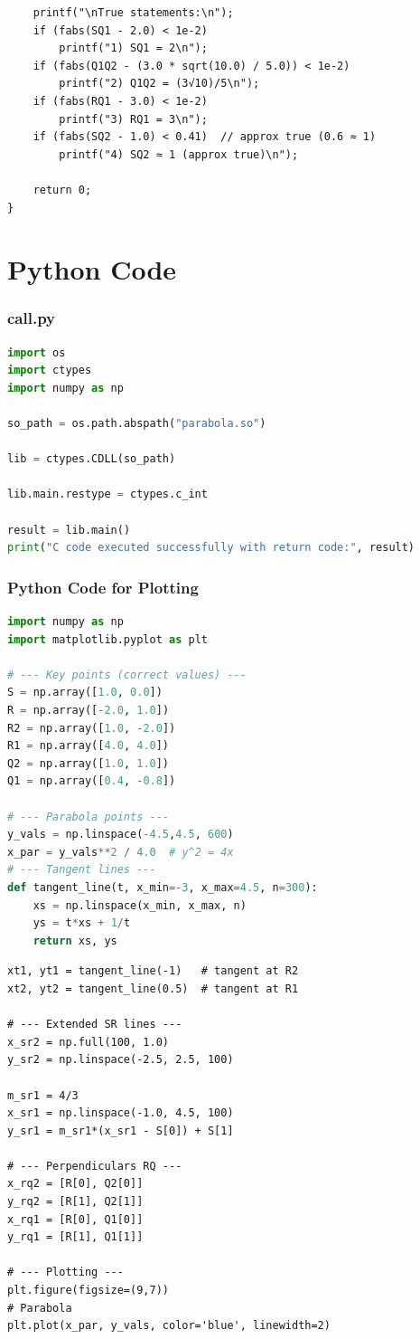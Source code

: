 \documentclass{beamer}
\theoremstyle{remark}
\numberwithin{equation}{section}
\numberwithin{equation}{section}
\begin{document}
\begin{frame}[fragile]
\begin{lstlisting}
    printf("\nTrue statements:\n");
    if (fabs(SQ1 - 2.0) < 1e-2)
        printf("1) SQ1 = 2\n");
    if (fabs(Q1Q2 - (3.0 * sqrt(10.0) / 5.0)) < 1e-2)
        printf("2) Q1Q2 = (3√10)/5\n");
    if (fabs(RQ1 - 3.0) < 1e-2)
        printf("3) RQ1 = 3\n");
    if (fabs(SQ2 - 1.0) < 0.41)  // approx true (0.6 ≈ 1)
        printf("4) SQ2 ≈ 1 (approx true)\n");

    return 0;
}

\end{lstlisting}
\end{frame}

\section{Python Code}
\begin{frame}[fragile]
\frametitle{call.py}
\begin{lstlisting}[language=Python]
import os
import ctypes
import numpy as np  

so_path = os.path.abspath("parabola.so")

lib = ctypes.CDLL(so_path)

lib.main.restype = ctypes.c_int

result = lib.main()
print("C code executed successfully with return code:", result)

\end{lstlisting}
\end{frame}
\begin{frame}[fragile]
\frametitle{Python Code for Plotting}
\begin{lstlisting}[language=Python]
import numpy as np
import matplotlib.pyplot as plt

# --- Key points (correct values) ---
S = np.array([1.0, 0.0])
R = np.array([-2.0, 1.0])
R2 = np.array([1.0, -2.0])
R1 = np.array([4.0, 4.0])
Q2 = np.array([1.0, 1.0])
Q1 = np.array([0.4, -0.8])

# --- Parabola points ---
y_vals = np.linspace(-4.5,4.5, 600)
x_par = y_vals**2 / 4.0  # y^2 = 4x
# --- Tangent lines ---
def tangent_line(t, x_min=-3, x_max=4.5, n=300):
    xs = np.linspace(x_min, x_max, n)
    ys = t*xs + 1/t
    return xs, ys
\end{lstlisting}
\end{frame}
\begin{frame}[fragile]
\begin{lstlisting}
xt1, yt1 = tangent_line(-1)   # tangent at R2
xt2, yt2 = tangent_line(0.5)  # tangent at R1

# --- Extended SR lines ---
x_sr2 = np.full(100, 1.0)
y_sr2 = np.linspace(-2.5, 2.5, 100)

m_sr1 = 4/3
x_sr1 = np.linspace(-1.0, 4.5, 100)
y_sr1 = m_sr1*(x_sr1 - S[0]) + S[1]

# --- Perpendiculars RQ ---
x_rq2 = [R[0], Q2[0]]
y_rq2 = [R[1], Q2[1]]
x_rq1 = [R[0], Q1[0]]
y_rq1 = [R[1], Q1[1]]

# --- Plotting ---
plt.figure(figsize=(9,7))
# Parabola
plt.plot(x_par, y_vals, color='blue', linewidth=2)
\end{lstlisting}
\end{frame}
\end{document}
